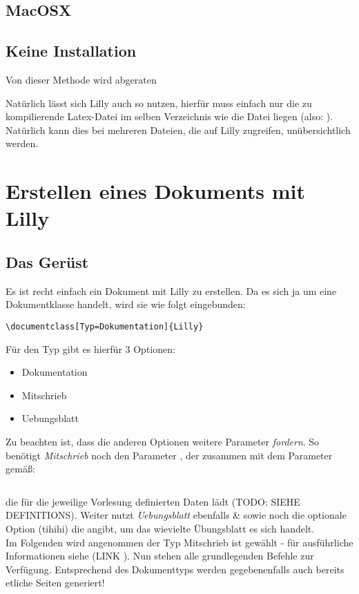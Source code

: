 \subsection{MacOSX }

\subsection{Keine Installation}
\begin{bemerkung}
    Von dieser Methode wird abgeraten
\end{bemerkung}
Natürlich lässt sich Lilly auch so nutzen, hierfür muss einfach nur die zu kompilierende Latex-Datei im selben Verzeichnis wie die Datei  liegen (also: ). Natürlich kann dies bei mehreren Dateien, die auf Lilly zugreifen, unübersichtlich werden.
\clearpage
\section[Erstellen eines Dokuments mit Lilly]{Erstellen eines Dokuments mit Lilly \tiny{}}
\subsection{Das Gerüst}
Es ist recht einfach ein Dokument mit Lilly zu erstellen. Da es sich ja um eine Dokumentklasse handelt, wird sie wie folgt eingebunden:
\begin{lstlisting}[style=latex]
\documentclass[Typ=Dokumentation]{Lilly} 
\end{lstlisting}
Für den Typ gibt es hierfür 3 Optionen:
\begin{multicols}{3}
    \begin{itemize}[label=$\diamond$]\narrowitems
        \item Dokumentation
        \item Mitschrieb
        \item Uebungsblatt
    \end{itemize}
\end{multicols}
Zu beachten ist, dass die anderen Optionen weitere Parameter \emph{fordern}. \newline
So benötigt \emph{Mitschrieb} noch den Parameter , der zusammen mit dem Parameter  gemäß:
\begin{lstlisting}[style=latex,frame=none]

\end{lstlisting}
die für die jeweilige Vorlesung definierten Daten lädt (TODO: SIEHE DEFINITIONS).
Weiter nutzt \emph{Uebungsblatt} ebenfalls \& sowie noch die optionale Option (tihihi)  die angibt, um das wievielte Übungsblatt es sich handelt. \\
Im Folgenden wird angenommen der Typ Mitschrieb ist gewählt - für ausführliche Informationen siehe (LINK ).
Nun stehen alle grundlegenden Befehle zur Verfügung. Entsprechend des Dokumenttyps werden gegebenenfalls auch bereits etliche Seiten generiert!
